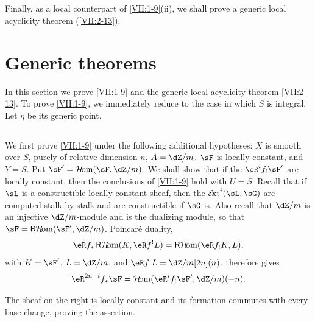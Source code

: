 \documentclass[12pt,oneside,english]{smfbook}
\DeclareMathOperator{\Ext}{\mathcal{E}\!xt} %
\DeclareMathOperator{\Hom}{\mathcal{H}\!om} %
\DeclareMathOperator{\rHom}{\mathsf{R}\mathcal{H}\!om}
\begin{document}
\subsection{}\label{VII:1-12}

Finally, as a local counterpart of \ref{VII:1-9}(ii), we shall prove a generic local acyclicity theorem (\ref{VII:2-13}).

\section{Generic theorems}\label{VII:2}

In this section we prove \ref{VII:1-9} and the generic local acyclicity theorem \ref{VII:2-13}. To prove \ref{VII:1-9}, we immediately reduce to the case in which $S$ is integral. Let $\eta$ be its generic point.

\subsection{}\label{VII:2-1}

We first prove \ref{VII:1-9} under the following additional hypotheses: $X$ is smooth over $S$, purely of relative dimension $n$, $A=\dZ/m$, $\sF$ is locally constant, and $Y=S$. Put $\sF'=\Hom(\sF,\dZ/m)$. We shall show that if the $\eR^if_!\sF'$ are locally constant, then the conclusions of \ref{VII:1-9} hold with $U=S$. Recall that if $\sL$ is a constructible locally constant sheaf, then the $\Ext^i(\sL,\sG)$ are computed stalk by stalk and are constructible if $\sG$ is. Also recall that $\dZ/m$ is an injective $\dZ/m$-module and is the dualizing module, so that $\sF=\rHom(\sF',\dZ/m)$. Poincaré duality,
\[
  \eR f_\ast \rHom(K,\eR f^! L) = \rHom(\eR f_! K,L) \text{,}
\]
with $K=\sF'$, $L=\dZ/m$, and $\eR f^!L=\dZ/m[2n](n)$, therefore gives
\[
  \eR^{2n-i} f_\ast \sF = \Hom(\eR^i f_! \sF',\dZ/m)(-n) \text{.}
\]

The sheaf on the right is locally constant and its formation commutes with every base change, proving the assertion.

\subsection{}\label{VII:2-2}
\end{document}
